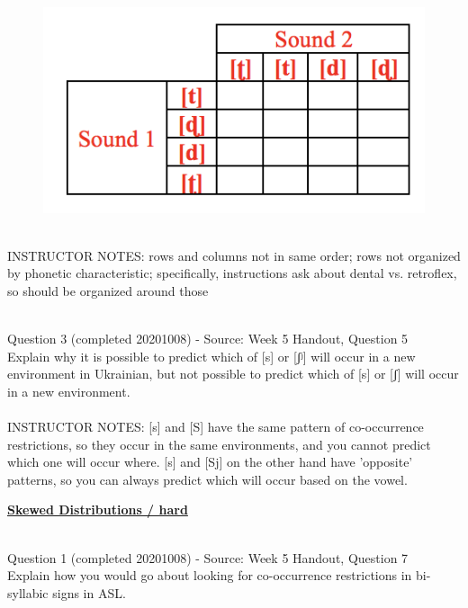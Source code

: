 \documentclass[12pt]{article}
\begin{document}
\begin{figure}[H]
\includegraphics{../images/Malto_table_bad.png}
\end{figure}

~\\
INSTRUCTOR NOTES: rows and columns not in same order; rows not organized by phonetic characteristic; specifically, instructions ask about dental vs. retroflex, so should be organized around those


~\\

{\large Question 3} (completed 20201008) - Source: Week 5 Handout, Question 5\\

Explain why it is possible to predict which of [s] or [ʃʲ] will occur in a new environment in Ukrainian, but not possible to predict which of [s] or [ʃ] will occur in a new environment.\\


~\\
INSTRUCTOR NOTES: [s] and [S] have the same pattern of co-occurrence restrictions, so they occur in the same environments, and you cannot predict which one will occur where. [s] and [Sj] on the other hand have 'opposite' patterns, so you can always predict which will occur based on the vowel.


\newpage\textbf{\underline{\huge Skewed Distributions / hard\\}}

~\\

{\large Question 1} (completed 20201008) - Source: Week 5 Handout, Question 7\\

Explain how you would go about looking for co-occurrence restrictions in bi-syllabic signs in ASL.\\
\end{document}
